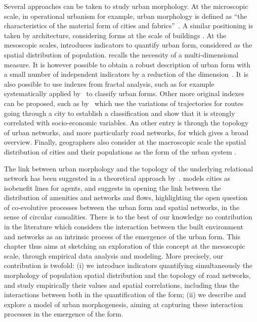 Several approaches can be taken to study urban morphology. At the microscopic scale, in operational urbanism for example, urban morphology is defined as ``the characteristics of the material form of cities and fabrics''~\citep{paquot2010abc}. A similar positioning is taken by architecture, considering forms at the scale of buildings \citep{moudon1997urban}. At the mesoscopic scales, \cite{tsai2005quantifying} introduces indicators to quantify urban form, considered as the spatial distribution of population. \cite{le2009quantifier} recalls the necessity of a multi-dimensional measure. It is however possible to obtain a robust description of urban form with a small number of independent indicators by a reduction of the dimension~\citep{Schwarz201029}. It is also possible to use indexes from fractal analysis, such as for example systematically applied by~\cite{2016arXiv160808839C} to classify urban forms. Other more original indexes can be proposed, such as by~\cite{lee2017morphology} which use the variations of trajectories for routes going through a city to establish a classification and show that it is strongly correlated with socio-economic variables. An other entry is through the topology of urban networks, and more particularly road networks, for which \citep{2015arXiv151201268L} gives a broad overview. Finally, geographers also consider at the macroscopic scale the spatial distribution of cities and their populations as the form of the urban system \citep{pumain2011systems}.



The link between urban morphology and the topology of the underlying relational network has been suggested in a theoretical approach by~\cite{badariotti2007conception}. \cite{d2015mathematize} models cities as isobenefit lines for agents, and suggests in opening the link between the distribution of amenities and networks and flows, highlighting the open question of co-evolutive processes between the urban form and spatial networks, in the sense of circular causalities. There is to the best of our knowledge no contribution in the literature which considers the interaction between the built environment and networks as an intrinsic process of the emergence of the urban form. This chapter thus aims at sketching an exploration of this concept at the mesoscopic scale, through empirical data analysis and modeling. More precisely, our contribution is twofold: (i) we introduce indicators quantifying simultaneously the morphology of population spatial distribution and the topology of road networks, and study empirically their values and spatial correlations, including thus the interactions between both in the quantification of the form; (ii) we describe and explore a model of urban morphogenesis, aiming at capturing these interaction processes in the emergence of the form.


